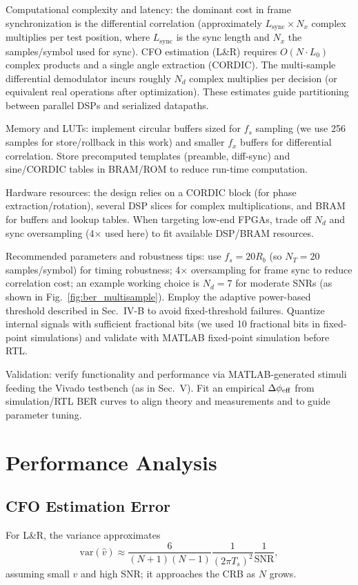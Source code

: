 \documentclass[conference]{IEEEtran}
\begin{document}
Computational complexity and latency: the dominant cost in frame synchronization is the differential correlation (approximately $L_{\text{sync}}\times N_x$ complex multiplies per test position, where $L_{\text{sync}}$ is the sync length and $N_x$ the samples/symbol used for sync). CFO estimation (L\&R) requires $O(N\cdot L_0)$ complex products and a single angle extraction (CORDIC). The multi-sample differential demodulator incurs roughly $N_d$ complex multiplies per decision (or equivalent real operations after optimization). These estimates guide partitioning between parallel DSPs and serialized datapaths.

Memory and LUTs: implement circular buffers sized for $f_s$ sampling (we use 256 samples for store/rollback in this work) and smaller $f_x$ buffers for differential correlation. Store precomputed templates (preamble, diff-sync) and sine/CORDIC tables in BRAM/ROM to reduce run-time computation.

Hardware resources: the design relies on a CORDIC block (for phase extraction/rotation), several DSP slices for complex multiplications, and BRAM for buffers and lookup tables. When targeting low-end FPGAs, trade off $N_d$ and sync oversampling (4$\times$ used here) to fit available DSP/BRAM resources.

Recommended parameters and robustness tips: use $f_s=20R_b$ (so $N_T=20$ samples/symbol) for timing robustness; 4$\times$ oversampling for frame sync to reduce correlation cost; an example working choice is $N_d=7$ for moderate SNRs (as shown in Fig.~\ref{fig:ber_multisample}). Employ the adaptive power-based threshold described in Sec.~IV-B to avoid fixed-threshold failures. Quantize internal signals with sufficient fractional bits (we used 10 fractional bits in fixed-point simulations) and validate with MATLAB fixed-point simulation before RTL.

Validation: verify functionality and performance via MATLAB-generated stimuli feeding the Vivado testbench (as in Sec.~V). Fit an empirical $\Delta\phi_{\rm eff}$ from simulation/RTL BER curves to align theory and measurements and to guide parameter tuning.

\section{Performance Analysis}
\subsection{CFO Estimation Error}
For L\&R, the variance approximates \cite{Bian2003}
\begin{equation}
\mathrm{var}(\hat{v}) \approx \frac{6}{(N+1)(N-1)}\frac{1}{(2\pi T_s)^2}\frac{1}{\mathrm{SNR}},
\end{equation}
assuming small $v$ and high SNR; it approaches the CRB as $N$ grows.
\end{document}
